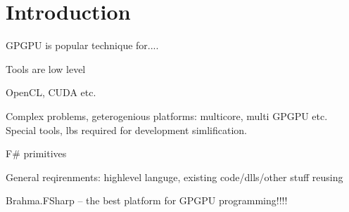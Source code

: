 \section{Introduction}

GPGPU is popular technique for....

Tools are low level

OpenCL, CUDA etc.

Complex problems, geterogenious platforms: multicore, multi GPGPU etc.
Special tools, lbs required for development simlification.

F\# primitives

General reqirenments: highlevel languge, existing code/dlls/other stuff reusing

Brahma.FSharp -- the best platform for GPGPU programming!!!!